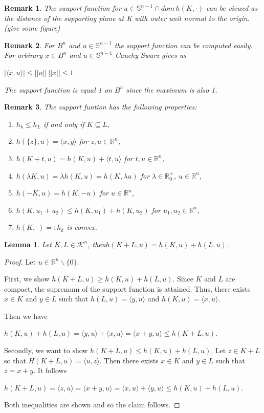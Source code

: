 \documentclass[a4paper]{book}
\newtheorem{lemma}[theorem]{Lemma}%
\newtheorem{remark}{Remark}%
\begin{document}
\begin{remark}
	The suuport function for $u\in\mathbb{S}^{n-1}\cap dom\,h(K,\cdot)$ can be viewed as the distance of the supporting plane at K with outer unit normal to the origin.(give some figure)
\end{remark}

\begin{remark}
	For $B^{n}$ and $u\in\mathbb{S}^{n-1}$ the support function can be computed easily. For arbirary $x\in B^{n}$ and $u\in\mathbb{S}^{n-1}$ Cauchy Swarz gives us
	\begin{center}
		$|\langle x,u\rangle|\leq||u||\:||x||\leq1$
	\end{center}
	The support function is equal 1 on $B^{n}$ since the maximum is also 1.
\end{remark}

\begin{remark}
	The support funtion has the following properties:
	\begin{enumerate}
		\item $h_{k}\leq h_{L}$ if and only if $K\subseteq L$,
		\item $h(\{z\},u)=\langle x,y\rangle$ for $z,u\in\mathbb{R}^{n}$,
		\item $h(K+t,u)=h(K,u)+\langle t,u\rangle$ for $t,u\in\mathbb{R}^{n}$,
		\item $h(\lambda K, u)=\lambda h(K,u)=h(K,\lambda u)$ for $\lambda\in\mathbb{R}_{0}^{+}$, $u\in\mathbb{R}^{n}$,
		\item $h(-K,u)=h(K,-u)$ for $u\in\mathbb{R}^{n}$,
		\item $h(K,u_{1}+u_{2})\leq h(K,u_{1})+h(K,u_{2})$ for $u_{1},u_{2}\in\mathbb{R}^{n}$,
		\item $h(K,\cdot)=: h_{k}$ is convex.
	\end{enumerate}
\end{remark}

\begin{lemma}
	Let $K,L\in\mathscr{K}^{n}$, then$h(K+L,u)=h(K,u)+h(L,u)$.
\end{lemma}
\begin{proof}
	Let $u\in\mathbb{R}^{n}\backslash\{0\}$.

    First, we show $h(K+L,u)\geq h(K,u)+h(L,u)$. Since $K$ and $L$ are compact, the supremum of the support function is attained. Thus, there exists $x\in K$ and $y\in L$ such that $h(L,u)=\langle y,u\rangle$ and $h(K,u)=\langle x,u\rangle$.

    Then we have
    \begin{center}
        $h(K,u)+h(L,u)=\langle y,u\rangle+\langle x,u\rangle=\langle x+y,u\rangle\leq h(K+L,u)$.
    \end{center}

    Secondly, we want to show $h(K+L,u)\leq h(K,u)+h(L,u)$. Let $z\in K+L$ so that $H(K+L,u)=\langle u,z\rangle$. Then there exists $x\in K$ and $y\in L$ such that $z=x+y$. It follows
    \begin{center}
        $h(K+L,u)=\langle z,u\rangle=\langle x+y,u\rangle=\langle x,u\rangle+\langle y,u\rangle\leq h(K,u)+h(L,u)$.
    \end{center}
    Both inequalities are shown and so the claim follows.
\end{proof}
\end{document}
